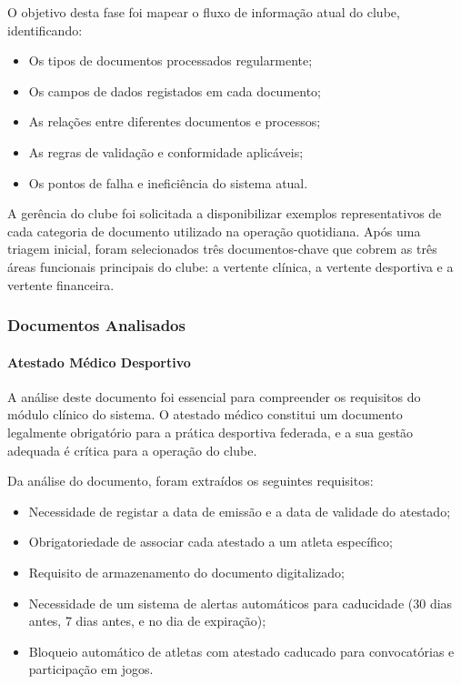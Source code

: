 \documentclass[a4paper,12pt]{scrreprt}
\begin{document}
{O objetivo desta fase foi mapear o fluxo de informação atual do clube, identificando:
\begin{itemize}
    \item Os tipos de documentos processados regularmente;
    \item Os campos de dados registados em cada documento;
    \item As relações entre diferentes documentos e processos;
    \item As regras de validação e conformidade aplicáveis;
    \item Os pontos de falha e ineficiência do sistema atual.
\end{itemize}

A gerência do clube foi solicitada a disponibilizar exemplos representativos de cada categoria de documento utilizado na operação quotidiana. Após uma triagem inicial, foram selecionados três documentos-chave que cobrem as três áreas funcionais principais do clube: a vertente clínica, a vertente desportiva e a vertente financeira.

\subsubsection{Documentos Analisados}

\paragraph{Atestado Médico Desportivo}

A análise deste documento foi essencial para compreender os requisitos do módulo clínico do sistema. O atestado médico constitui um documento legalmente obrigatório para a prática desportiva federada, e a sua gestão adequada é crítica para a operação do clube.

Da análise do documento, foram extraídos os seguintes requisitos:
\begin{itemize}
    \item Necessidade de registar a data de emissão e a data de validade do atestado;
    \item Obrigatoriedade de associar cada atestado a um atleta específico;
    \item Requisito de armazenamento do documento digitalizado;
    \item Necessidade de um sistema de alertas automáticos para caducidade (30 dias antes, 7 dias antes, e no dia de expiração);
    \item Bloqueio automático de atletas com atestado caducado para convocatórias e participação em jogos.
\end{itemize}

}
\end{document}
